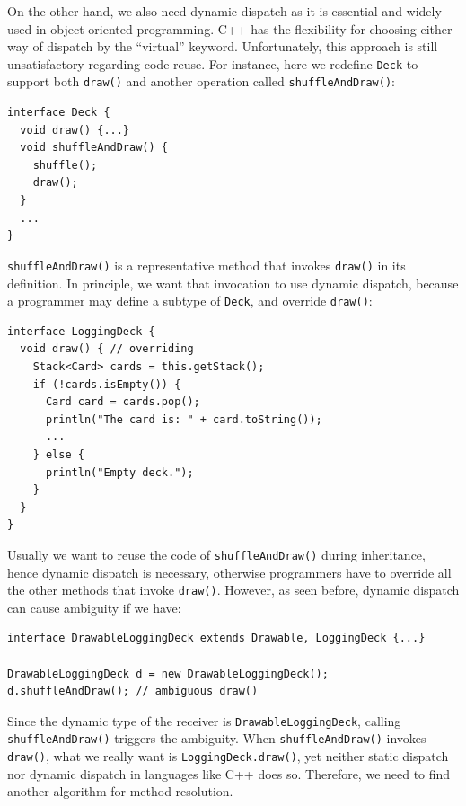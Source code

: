 On the other hand, we also need dynamic dispatch as it is essential and widely used in object-oriented programming.
C++ has the flexibility for choosing either way of dispatch by the ``virtual'' keyword.
Unfortunately, this approach is still unsatisfactory regarding code reuse. For instance, here we redefine \lstinline|Deck| to support
both \lstinline|draw()| and another operation called \lstinline|shuffleAndDraw()|:
\vspace{3pt}\begin{lstlisting}
interface Deck {
  void draw() {...}
  void shuffleAndDraw() {
    shuffle();
    draw();
  }
  ...
}
\end{lstlisting}\vspace{3pt}
\lstinline|shuffleAndDraw()| is a representative method that invokes \lstinline|draw()| in its definition. In principle, we want
that invocation to use dynamic dispatch, because a programmer may define a subtype of \lstinline|Deck|, and override \lstinline|draw()|:
\vspace{3pt}\begin{lstlisting}
interface LoggingDeck {
  void draw() { // overriding
    Stack<Card> cards = this.getStack();
    if (!cards.isEmpty()) {
      Card card = cards.pop();
      println("The card is: " + card.toString());
      ...
    } else {
      println("Empty deck.");
    }
  }
}
\end{lstlisting}\vspace{3pt}
Usually we want to reuse the code of \lstinline|shuffleAndDraw()| during inheritance, hence dynamic dispatch is necessary, otherwise
programmers have to override all the other methods that invoke \lstinline|draw()|. However, as seen before, dynamic dispatch can cause
ambiguity if we have:
\vspace{3pt}\begin{lstlisting}
interface DrawableLoggingDeck extends Drawable, LoggingDeck {...}

DrawableLoggingDeck d = new DrawableLoggingDeck();
d.shuffleAndDraw(); // ambiguous draw()
\end{lstlisting}\vspace{3pt}
Since the dynamic type of the receiver is \lstinline|DrawableLoggingDeck|, calling \lstinline|shuffleAndDraw()| triggers the ambiguity. When \lstinline|shuffleAndDraw()| invokes \lstinline|draw()|, what we really want is \lstinline|LoggingDeck.draw()|, yet
neither static dispatch nor dynamic dispatch in languages like C++ does so.
 Therefore, we need to find another algorithm for method resolution.

